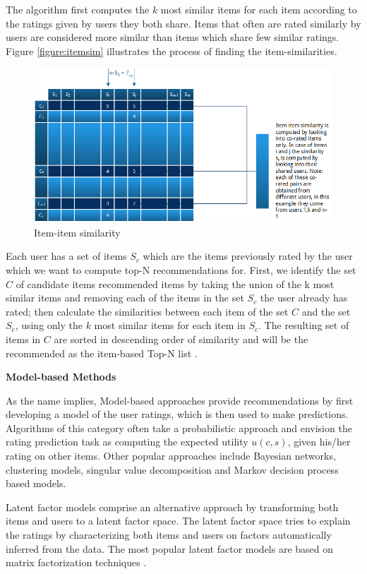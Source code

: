 The algorithm first computes the $k$ most similar items for each item according to the ratings given by users they both share. Items that often are rated similarly by users are considered more similar than items which share few similar ratings. Figure \ref{figure:itemsim} illustrates the process of finding the item-similarities.

\begin{figure}[H]
    \includegraphics[width=5in]{image/itemsim.png}
    \centering
    \caption[Item-item similarity]{Item-item similarity}
    \label{figure:ratingmatrix}
\end{figure}

Each user has a set of items $S_{c}$ which are the items previously rated by the user which we want to compute top-N recommendations for. First, we identify the set $C$ of candidate items recommended items by taking the union of the k most similar items and removing each of the items in the set $S_{c}$ the user already has rated; then calculate the similarities between each item of the set $C$ and the set $S_{c}$, using only the $k$ most similar items for each item in $S_{c}$. The resulting set of items in $C$ are sorted in descending order of similarity and will be the recommended as the item-based Top-N list \cite{Karypis2001}.

\textbf{Model-based Methods}

As the name implies, Model-based approaches provide recommendations by first developing a model of the user ratings, which is then used to make predictions. Algorithms of this category often take a probabilistic approach and envision the rating prediction task as computing the expected utility $u(c,s)$, given his/her rating on other items. Other popular approaches include Bayesian networks, clustering models, singular value decomposition and Markov decision process based models.

Latent factor models comprise an alternative approach by transforming both items and users to a latent factor space. The latent factor space tries to explain the ratings by characterizing both items and users on factors automatically inferred from the data. The most popular latent factor models are based on matrix factorization techniques \cite{Koren2009}.

